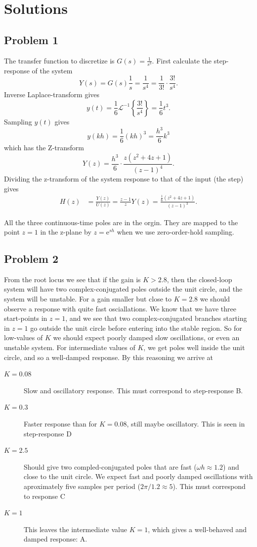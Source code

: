 \documentclass[letter,11pt]{scrartcl}
\begin{document}
\section*{Solutions}
\subsection*{Problem 1}
   The transfer function to discretize is \(G(s) = \frac{1}{s^3}\). First calculate the step-response of the system \[Y(s) = G(s)\frac{1}{s} = \frac{1}{s^4} = \frac{1}{3!}\cdot \frac{3!}{s^4}.\] Inverse Laplace-transform gives 
   \[ y(t) = \frac{1}{6} \mathcal{L}^{-1} \left\{\frac{3!}{s^4}\right\} = \frac{1}{6} t^3.\]
   Sampling $y(t)$ gives
   \[ y(kh) = \frac{1}{6} (kh)^3 =  \frac{h^3}{6} k^3 \]
   which has the Z-transform
   \[ Y(z) = \frac{h^3}{6} \cdot \frac{z(z^2 + 4z + 1)}{(z-1)^4}.\]
   Dividing the z-transform of the system response to that of the input (the step) gives
   \begin{align*}
   H(z) &= \frac{Y(z)}{U(z)} = \frac{z-1}{z}Y(z) = \frac{\frac{1}{6}(z^2 + 4z + 1)}{(z-1)^3}.
   \end{align*}

   All the three continuous-time poles are in the orgin. They are mapped to the point $z=1$ in the z-plane by $z=\mathrm{e}^{sh}$ when we use zero-order-hold sampling.

\subsection*{Problem 2}

From the root locus we see that if the gain is $K>2.8$, then the closed-loop system will have two complex-conjugated poles outside the unit circle, and the system will be unstable.  For a gain smaller but close to $K=2.8$ we should observe a response with quite fast osciallations. We know that we have three start-points in $z=1$, and we see that two complex-conjugated branches starting in $z=1$ go outside the unit circle before entering into the stable region. So for low-values of $K$ we should expect poorly damped slow oscillations, or even an unstable system. For intermediate values of $K$, we get poles well inside the unit circle, and so a well-damped response. By this reasoning we arrive at

\begin{description}
\item[$K=0.08$] Slow and oscillatory response. This must correspond to step-response B.
\item[$K=0.3$] Faster response than for $K=0.08$, still maybe oscillatory. This is seen in step-response D
\item[$K=2.5$] Should give two compled-conjugated poles that are fast ($ \omega h \approx 1.2$) and close to the unit circle. We expect fast and poorly damped oscillations with aproximately  five samples per period ($2\pi/1.2 \approx 5$). This must correspond to response C
\item[$K=1$] This leaves the intermediate value $K=1$, which gives a well-behaved and damped response: A.
\end{description}
\end{document}
